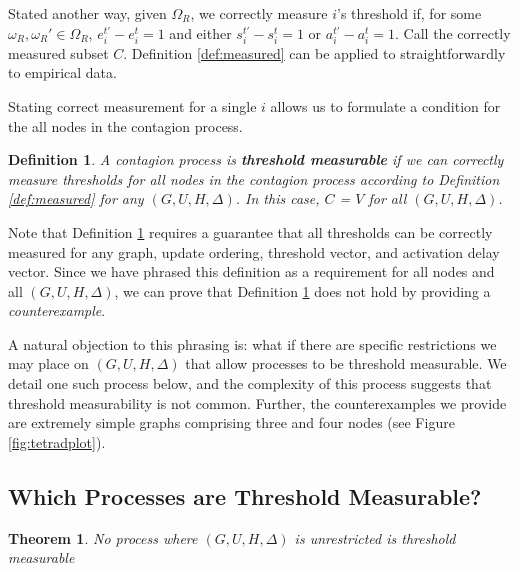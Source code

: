 \documentclass[a4paper]{article}
\newtheorem{definition}{Definition}
\newtheorem{theorem}{Theorem}
\begin{document}
Stated another way, given $\Omega_R$, we correctly measure $i$'s threshold if, for some $\omega_R, \omega_R' \in \Omega_R$, $e_i^{t'} - e_i^t = 1$ and either $s_i^{t'} - s_i^t = 1$ or $a_i^{t'} - a_i^t = 1$. Call the correctly measured subset $C$. Definition \ref{def:measured} can be applied to straightforwardly to empirical data.

Stating correct measurement for a single $i$ allows us to formulate a condition for the all nodes in the contagion process.

\begin{definition} \label{def:measurable}
A contagion process is \textbf{threshold measurable} if we can correctly measure thresholds for all nodes in the contagion process according to Definition \ref{def:measured} for any $(G, U, H, \Delta)$. In this case, $C$ = $V$ for all $(G, U, H, \Delta)$.
\end{definition}

\noindent
Note that Definition \ref{def:measurable} requires a guarantee that all thresholds can be correctly measured for any graph, update ordering, threshold vector, and activation delay vector. Since we have phrased this definition as a requirement for all nodes and all $(G, U, H, \Delta)$, we can prove that Definition \ref{def:measurable} does not hold by providing a \emph{counterexample}.

A natural objection to this phrasing is: what if there are specific restrictions we may place on $(G, U, H, \Delta)$ that allow processes to be threshold measurable. We detail one such process below, and the complexity of this process suggests that threshold measurability is not common. Further, the counterexamples we provide are extremely simple graphs comprising three and four nodes (see Figure \ref{fig:tetradplot}).

\subsection{Which Processes are Threshold Measurable?}

\begin{theorem} \label{theorem:public}
No process where $(G, U, H, \Delta)$ is unrestricted is threshold measurable
\end{theorem}
\end{document}
